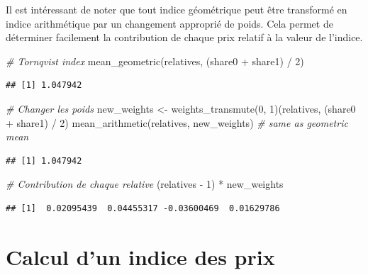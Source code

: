 \documentclass[
]{article}
\newenvironment{Shaded}{\begin{snugshade}}{\end{snugshade}}
\newcommand{\CommentTok}[1]{\textcolor[rgb]{0.56,0.35,0.01}{\textit{#1}}}
\newcommand{\DecValTok}[1]{\textcolor[rgb]{0.00,0.00,0.81}{#1}}
\newcommand{\FunctionTok}[1]{\textcolor[rgb]{0.00,0.00,0.00}{#1}}
\newcommand{\NormalTok}[1]{#1}
\newcommand{\OtherTok}[1]{\textcolor[rgb]{0.56,0.35,0.01}{#1}}
\newcommand{\SpecialCharTok}[1]{\textcolor[rgb]{0.00,0.00,0.00}{#1}}
\begin{document}
Il est intéressant de noter que tout indice géométrique peut être transformé en indice arithmétique par un changement approprié de poids. Cela permet de déterminer facilement la contribution de chaque prix relatif à la valeur de l'indice.

\begin{Shaded}
\begin{Highlighting}[]
\CommentTok{\# Tornqvist index}
\FunctionTok{mean\_geometric}\NormalTok{(relatives, (share0 }\SpecialCharTok{+}\NormalTok{ share1) }\SpecialCharTok{/} \DecValTok{2}\NormalTok{) }
\end{Highlighting}
\end{Shaded}

\begin{verbatim}
## [1] 1.047942
\end{verbatim}

\begin{Shaded}
\begin{Highlighting}[]
\CommentTok{\# Changer les poids}
\NormalTok{new\_weights }\OtherTok{\textless{}{-}} \FunctionTok{weights\_transmute}\NormalTok{(}\DecValTok{0}\NormalTok{, }\DecValTok{1}\NormalTok{)(relatives, (share0 }\SpecialCharTok{+}\NormalTok{ share1) }\SpecialCharTok{/} \DecValTok{2}\NormalTok{)}
\FunctionTok{mean\_arithmetic}\NormalTok{(relatives, new\_weights) }\CommentTok{\# same as geometric mean}
\end{Highlighting}
\end{Shaded}

\begin{verbatim}
## [1] 1.047942
\end{verbatim}

\begin{Shaded}
\begin{Highlighting}[]
\CommentTok{\# Contribution de chaque relative}
\NormalTok{(relatives }\SpecialCharTok{{-}} \DecValTok{1}\NormalTok{) }\SpecialCharTok{*}\NormalTok{ new\_weights}
\end{Highlighting}
\end{Shaded}

\begin{verbatim}
## [1]  0.02095439  0.04455317 -0.03600469  0.01629786
\end{verbatim}

\hypertarget{calcul-dun-indice-des-prix}{%
\section{Calcul d'un indice des prix}\label{calcul-dun-indice-des-prix}}
\end{document}
